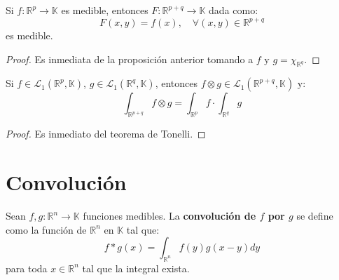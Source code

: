 \documentclass[12pt]{report}
\theoremstyle{largebreak}
\newcommand\cf[3]{\ensuremath{#1:#2\rightarrow#3}}
\begin{document}
    \begin{cor}
        Si $\cf{f}{\mathbb{R}^p}{\mathbb{K}}$ es medible, entonces $\cf{F}{\mathbb{R}^{ p+q}}{\mathbb{K}}$ dada como:
        \begin{equation*}
            F(x,y)=f(x),\quad\forall (x,y)\in\mathbb{R}^{ p+q}
        \end{equation*}
        es medible.
    \end{cor}

    \begin{proof}
        Es inmediata de la proposición anterior tomando a $f$ y $g=\chi_{\mathbb{R}^q}$.
        
    \end{proof}

    \begin{cor}
        Si $f\in\mathcal{L}_1(\mathbb{R}^p,\mathbb{K})$, $g\in\mathcal{L}_1(\mathbb{R}^q,\mathbb{K})$, entonces $f\otimes g\in \mathcal{L}_1(\mathbb{R}^{p+q},\mathbb{K})$ y:
        \begin{equation*}
            \int_{\mathbb{R}^{p+q}}f\otimes g=\int_{\mathbb{R}^p}f\cdot\int_{\mathbb{R}^q}g
        \end{equation*}
    \end{cor}

    \begin{proof}
        Es inmediato del teorema de Tonelli.
    \end{proof}

    \section{Convolución}

    \begin{mydef}
        Sean $\cf{f,g}{\mathbb{R}^n}{\mathbb{K}}$ funciones medibles. La \textbf{convolución de $f$ por $g$} se define como la función de $\mathbb{R}^n$ en $\mathbb{K}$ tal que:
        \begin{equation*}
            f*g(x)=\int_{\mathbb{R}^n}f(y)g(x-y)dy
        \end{equation*}
        para toda $x\in\mathbb{R}^n$ tal que la integral exista.
    \end{mydef}
\end{document}
